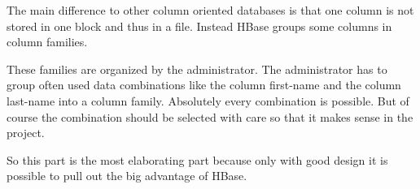 The main difference to other column oriented databases is that one column is not stored in one block and thus in a file. 
Instead HBase groups some columns in column families.
\cite{hbase.daniel.abadi.2010}

These families are organized by the administrator.
The administrator has to group often used data combinations like the column first-name and the column last-name into a column family.
Absolutely every combination is possible.
But of course the combination should be selected with care so that it makes sense in the project.
\cite{hbase.daniel.abadi.2010}

So this part is the most elaborating part because only with good design it is possible to pull out the big advantage of HBase.
